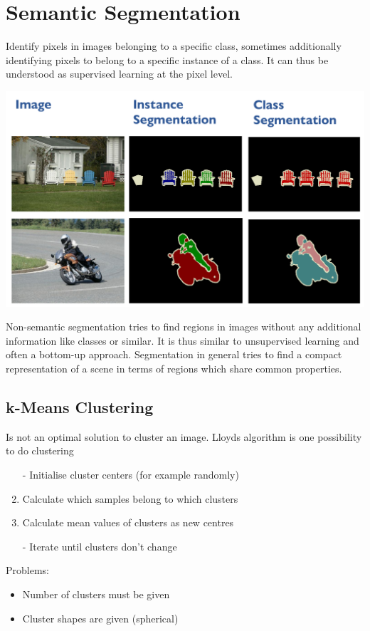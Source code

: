 \documentclass[11pt]{article}
\theoremstyle{definition}
\begin{document}
\section{Semantic Segmentation}
Identify pixels in images belonging to a specific class, sometimes additionally identifying pixels to belong to a specific instance of a class. It can thus be understood as supervised learning at the pixel level.
\begin{center}
	\includegraphics[width=0.7\linewidth]{img/semantic_segmentation}
\end{center}
Non-semantic segmentation tries to find regions in images without any additional information like classes or similar. It is thus similar to unsupervised learning and often a bottom-up approach. Segmentation in general tries to find a compact representation of a scene in terms of regions which share common properties.

\subsection{k-Means Clustering}
Is not an optimal solution to cluster an image. Lloyds algorithm is one possibility to do clustering
\begin{enumerate}
	\item[-] Initialise cluster centers (for example randomly)
	\item Calculate which samples belong to which clusters
	\item Calculate mean values of clusters as new centres
	\item[-] Iterate until clusters don't change
\end{enumerate}
Problems:
\begin{itemize}
	\item Number of clusters must be given
	\item Cluster shapes are given (spherical)
\end{itemize}
\end{document}
